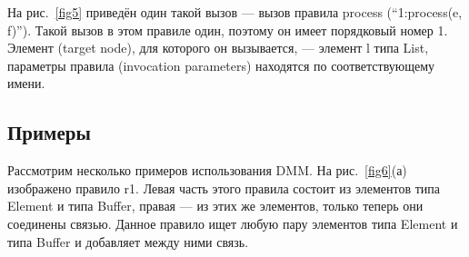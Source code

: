 \documentclass[a5paper]{article}
\begin{document}
На рис.~\ref{fig5} приведён один такой вызов --- вызов правила process (“1:process(e, f)”). Такой вызов в этом правиле один, поэтому он имеет порядковый номер 1. Элемент (target node), для которого он вызывается, — элемент l типа List, параметры правила (invocation parameters) находятся по соответствующему имени.

\subsection{Примеры}

Рассмотрим несколько примеров использования DMM. На рис.~\ref{fig6}(а) изображено правило r1. Левая часть этого правила состоит из элементов типа Element и типа Buffer, правая --- из этих же элементов, только теперь они соединены связью. Данное правило ищет любую пару элементов типа Element и типа Buffer и добавляет между ними связь.
\end{document}
